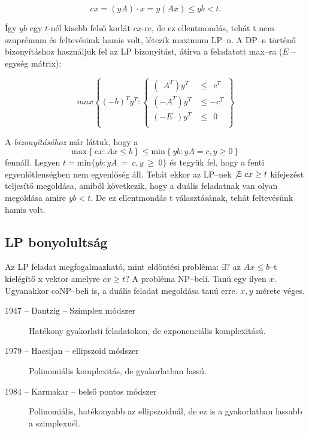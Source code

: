 \[ cx = (yA)\cdot x = y (Ax) \leq yb < t.\]

Így $yb$ egy $t$-nél kisebb felső korlát $cx$-re, de ez ellentmondás, tehát t
nem szuprémum és feltevésünk hamis volt, létezik maximum LP--n. A DP--n történő
bizonyításhoz használjuk fel az LP bizonyítást, átírva a feladatott max--ra ($E$
-- egység mátrix):

\[ max \left\{ (-b)^T y^T :
	\begin{cases}
		(~~A^T)y^T & \leq~~c^T \\
		(-A^T) y^T & \leq -c^T \\
		(-E~~)y^T  & \leq~~0   \\
	\end{cases}  \right\} \]

A  \emph{bizonyításához} már láttuk, hogy a \[ \mbox{max}\left\{
	cx:Ax \leq b \right\} \leq
	\mbox{min}\left\{ yb:yA = c, y \geq 0 \right\}
\] fennáll. Legyen $t=\mbox{min}\{ yb:yA~=~c, y~\geq~0 \}$ és tegyük fel, hogy a
fenti egyenlőtlenségben nem egyenlőség áll.  Tehát ekkor az LP--nek
$\not\exists~cx \geq t$ kifejezést teljesítő megoldása, amiből következik,
hogy a duális feladatnak van olyan megoldása amire $yb<t$. De ez ellentmondás t
választásának, tehát feltevésünk hamis volt.

\subsection{LP bonyolultság}

Az LP feladat megfogalmazható, mint eldöntési probléma: $\exists?$ az $Ax \leq
	b$--t kielégítő x vektor amelyre $cx\geq t$? A probléma NP--beli. Tanú egy ilyen
$x$. Ugyanakkor coNP--beli is, a duális feladat megoldása tanú erre. $x, y$
mérete véges.

\begin{description}
	\item[1947 -- Dantzig -- Szimplex módszer] Hatékony gyakorlati feladatokon, de
	      exponenciális komplexitású.
	\item[1979 --  Hacsijan -- ellipszoid módszer] Polinomiális komplexitás, de
	      gyakorlatban lassú.
	\item[1984 --  Karmakar -- belső pontos módszer]  Polinomiális, hatékonyabb az
	      ellipszoidnál, de ez is a gyakorlatban lassabb a szimplexnél.
\end{description}
